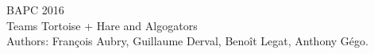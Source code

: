 \documentclass[2pt,a4paper]{article}
\begin{document}
\begin{multicols}{2}
{\Huge BAPC 2016}\\
{\Large Teams Tortoise + Hare and Algogators}\\
Authors: François Aubry, Guillaume Derval, Benoît Legat, Anthony Gégo.
\tableofcontents







\end{multicols}
\end{document}

